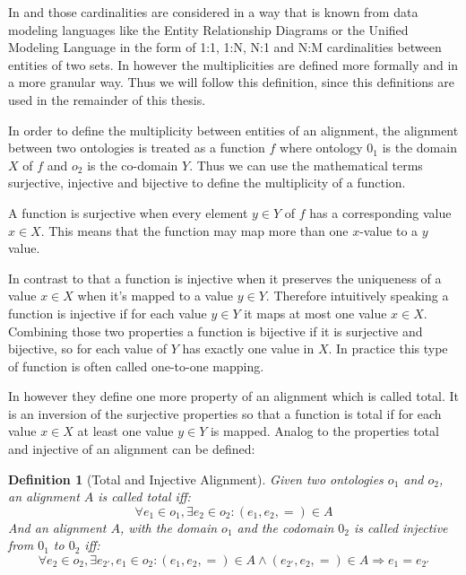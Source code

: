 \documentclass[11pt,titlepage,oneside,openany,a4paper]{report}
\newtheorem{definition}{Definition}[chapter]
\begin{document}
In \cite{Rahm:2001} and \cite{ehrig2006ontology} those cardinalities are considered in a way that is known from data modeling languages like the Entity Relationship Diagrams or the Unified Modeling Language in the form of 1:1, 1:N, N:1 and N:M cardinalities between entities of two sets. In \cite{euzenat2013d} however the multiplicities are defined more formally and in a more granular way. Thus we will follow this definition, since this definitions are used in the remainder of this thesis.

In order to define the multiplicity between entities of an alignment, the alignment between two ontologies is treated as a function $f$ where ontology $0_1$ is the domain $X$ of $f$ and $o_2$ is the co-domain $Y$. Thus we can use the mathematical terms surjective, injective and bijective to define the multiplicity of a function.

A function is surjective when every element $y \in Y$ of $f$ has a corresponding value $x \in X$. This means that the function may map more than one $x$-value to a $y$ value.

In contrast to that a function is injective when it preserves the uniqueness of a value $x \in X$ when it's mapped to a value $y \in Y$. Therefore intuitively speaking a function is injective if for each value $y \in Y$ it maps at most one value $x \in X$.
Combining those two properties a function is bijective if it is surjective and bijective, so for each value of $Y$ has exactly one value in $X$. In practice this type of function is often called one-to-one mapping.

In \cite{euzenat2013d} however they define one more property of an alignment which is called total. It is an inversion of the surjective properties so that a function is total if for each value $x \in X$ at least one value $y \in Y$ is mapped.
Analog to \cite{euzenat2013d} the properties total and injective of an alignment can be defined:
\begin{definition} [Total and Injective Alignment]
Given two ontologies $o_1$ and $o_2$, an alignment $A$ is called total iff:
\begin{equation*}
\forall e_1 \in o_1, \exists e_2 \in o_2 : (e_1,e_2,=) \in A
\end{equation*}
And an alignment $A$, with the domain $o_1$ and the codomain $0_2$ is called injective from $0_1$ to $0_2$ iff:
\begin{equation*}
\forall e_2 \in o_2 , \exists e_{2'},e_1 \in o_2 : (e_1,e_2,=) \in A \wedge (e_{2'},e_2,=) \in A \Rightarrow e_1 = e_{2'}
\end{equation*}
\end{definition}
\end{document}
